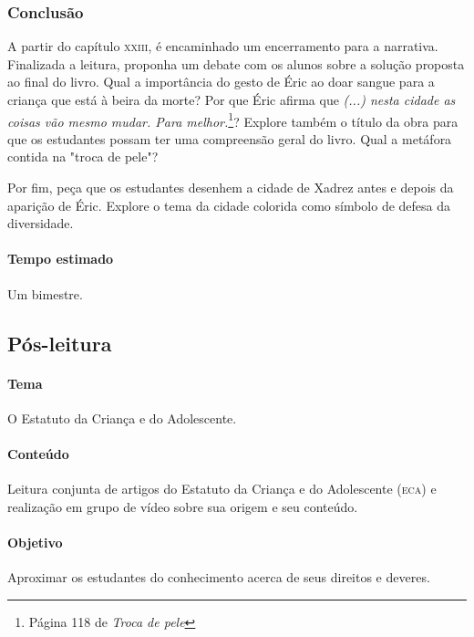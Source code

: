 \documentclass[11pt]{extarticle}
\begin{document}
\subsubsection{Conclusão}

A partir do capítulo \textsc{xxiii}, é encaminhado um encerramento para a narrativa. Finalizada a leitura, proponha um debate com os alunos sobre a solução proposta ao final do livro. Qual a importância do gesto de Éric ao doar sangue para a criança que está à beira da morte? Por que Éric afirma que \textit{(...) nesta cidade as coisas vão mesmo mudar. Para melhor.}\footnote{Página 118 de \textit{Troca de pele}}? Explore também o título da obra para que os estudantes possam ter uma compreensão geral do livro. Qual a metáfora contida na "troca de pele"? 

Por fim, peça que os estudantes desenhem a cidade de Xadrez antes e depois da aparição de Éric. Explore o tema da cidade colorida como símbolo de defesa da diversidade.

\paragraph{Tempo estimado} Um bimestre.

\subsection{Pós-leitura}


\paragraph{Tema} O Estatuto da Criança e do Adolescente.

\paragraph{Conteúdo} Leitura conjunta de artigos do Estatuto da Criança e do Adolescente (\textsc{eca}) e realização em grupo de vídeo sobre sua origem e seu conteúdo.

\paragraph{Objetivo} Aproximar os estudantes do conhecimento acerca de seus direitos e deveres.
\end{document}
